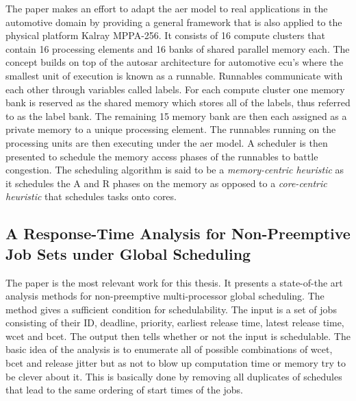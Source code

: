 \documentclass{kththesis}
\begin{document}
The paper \parencite{becker_contention-free_2016} makes an effort to adapt the \acrshort{aer} model
to real applications in the automotive domain by providing a general framework that is also applied
to the physical platform Kalray MPPA-256. It consists of 16 compute clusters that contain 16
processing elements and 16 banks of shared parallel memory each. The concept builds on top of the
\acrshort{autosar} architecture for automotive \acrshort{ecu}'s where the smallest unit of execution
is known as a runnable. Runnables communicate with each other through variables called labels. For
each compute cluster one memory bank is reserved as the shared memory which stores all of the
labels, thus referred to as the label bank. The remaining 15 memory bank are then each assigned as a
private memory to a unique processing element. The runnables running on the processing units are
then executing under the \acrshort{aer} model. A scheduler is then presented to schedule the memory
access phases of the runnables to battle congestion. The scheduling algorithm is said to be a
\textit{memory-centric heuristic} as it schedules the A and R phases on the memory as opposed to a
\textit{core-centric heuristic} that schedules tasks onto cores.


\subsection{A Response-Time Analysis for Non-Preemptive Job Sets under Global
Scheduling}\label{subsec:artafnpjsug}

The paper \parencite{nasri_response-time_2018} is the most relevant work for this thesis. It
presents a state-of-the art analysis methods for non-preemptive multi-processor global scheduling.
The method gives a sufficient condition for schedulability. The input is a set of jobs consisting of
their ID, deadline, priority, earliest release time, latest release time, \acrshort{wcet} and
\acrshort{bcet}.  The output then tells whether or not the input is schedulable. The basic idea of
the analysis is to enumerate all of possible combinations of \acrshort{wcet}, \acrshort{bcet} and
release jitter but as not to blow up computation time or memory try to be clever about it. This is
basically done by removing all duplicates of schedules that lead to the same ordering of start times
of the jobs.
\end{document}
